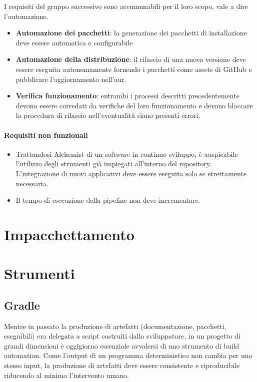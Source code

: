 I requisiti del gruppo successivo sono accumunabili per il loro scopo, vale a dire l'automazione.

\begin{itemize}
	\item \textbf{Automazione dei pacchetti}: la generazione dei pacchetti di installazione deve essere automatica e configurabile
	\item \textbf{Automazione della distribuzione}: il rilascio di una nuova versione deve essere eseguita autonomamente fornendo i pacchetti come assets di GitHub e pubblicare l'aggiornamento nell'\ac{aur}.
	\item \textbf{Verifica funzionamento}: entrambi i processi descritti precedentemente devono essere corredati da verifiche del loro funzionamento e devono bloccare la procedura di rilascio nell'eventualità siano presenti errori.
\end{itemize}

\paragraph{Requisiti non funzionali}

\begin{itemize}
	\item Trattandosi Alchemist di un software in continuo sviluppo, è auspicabile l'utilizzo degli strumenti già impiegati all'interno del repository. \\ L'integrazione di nuovi applicativi deve essere eseguita solo se strettamente necessaria.
	\item Il tempo di esecuzione della pipeline non deve incrementare.
\end{itemize}

\section{Impacchettamento}

\section{Strumenti}

\subsection{Gradle}

Mentre in passato la produzione di artefatti (documentazione, pacchetti, eseguibili) era delegata a script costruiti dallo sviluppatore, in un progetto di grandi dimensioni è oggigiorno essenziale avvalersi di uno strumento di build automation. Come l'output di un programma deterministico non cambia per uno stesso input, la produzione di artefatti deve essere consistente e riproducibile riducendo al minimo l'intervento umano. 

